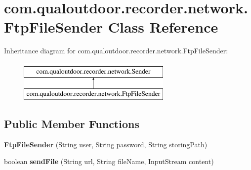 \hypertarget{classcom_1_1qualoutdoor_1_1recorder_1_1network_1_1FtpFileSender}{\section{com.\-qualoutdoor.\-recorder.\-network.\-Ftp\-File\-Sender Class Reference}
\label{classcom_1_1qualoutdoor_1_1recorder_1_1network_1_1FtpFileSender}
}
Inheritance diagram for com.\-qualoutdoor.\-recorder.\-network.\-Ftp\-File\-Sender\-:\begin{figure}[H]
\begin{center}
\leavevmode
\includegraphics[height=2.000000cm]{classcom_1_1qualoutdoor_1_1recorder_1_1network_1_1FtpFileSender}
\end{center}
\end{figure}
\subsection*{Public Member Functions}
\begin{DoxyCompactItemize}
\item 
\hypertarget{classcom_1_1qualoutdoor_1_1recorder_1_1network_1_1FtpFileSender_a8a4412ad62acffa9d0ca98d27730b741}{{\bfseries Ftp\-File\-Sender} (String user, String password, String storing\-Path)}\label{classcom_1_1qualoutdoor_1_1recorder_1_1network_1_1FtpFileSender_a8a4412ad62acffa9d0ca98d27730b741}

\item 
\hypertarget{classcom_1_1qualoutdoor_1_1recorder_1_1network_1_1FtpFileSender_ac8e2f38fd71b35479e1ab11e4d1a4f16}{boolean {\bfseries send\-File} (String url, String file\-Name, Input\-Stream content)}\label{classcom_1_1qualoutdoor_1_1recorder_1_1network_1_1FtpFileSender_ac8e2f38fd71b35479e1ab11e4d1a4f16}

\end{DoxyCompactItemize}
